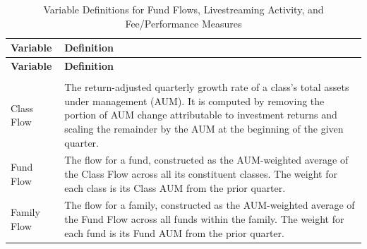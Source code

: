 \begin{longtable}{lp{}}

\caption{Variable Definitions for Fund Flows, Livestreaming Activity, and Fee/Performance Measures}\label{tab:variable_definitions} \\

    \toprule
    \textbf{Variable}              & \textbf{Definition}                                                                                                                                                                                                                                                                                               \\
    \midrule
    \endfirsthead%
    \midrule
    \textbf{Variable}              & \textbf{Definition}                                                                                                                                                                                                                                                                                               \\
    \midrule
    \endhead%
    \endfoot%
    \endlastfoot%

    \multicolumn{2}{l}{\textbf{Fund Flow Variables}}                                                                                                                                                                                                                         \\
    \midrule
    Class Flow                     & The return-adjusted quarterly growth rate of a class's total assets under management (AUM). It is computed by removing the portion of AUM change attributable to investment returns and scaling the remainder by the AUM at the beginning of the given quarter.                                                   \\
    \midrule
    Fund Flow                      & The flow for a fund, constructed as the AUM-weighted average of the Class Flow across all its constituent classes. The weight for each class is its Class AUM from the prior quarter.                                                                                                                             \\
    \midrule
    Family Flow                    & The flow for a family, constructed as the AUM-weighted average of the Fund Flow across all funds within the family. The weight for each fund is its Fund AUM from the prior quarter.                                                                                                                              \\
    \midrule


\end{longtable}
